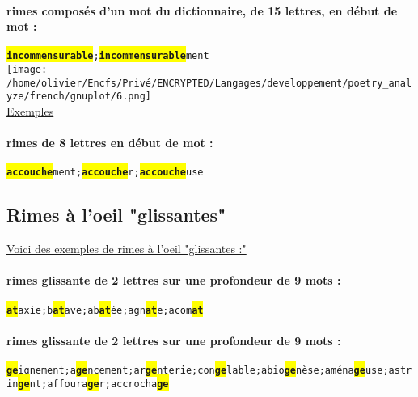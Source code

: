\documentclass[french]{article}
\begin{document}
\paragraph{rimes composés d'un mot du dictionnaire, de 15 lettres, en début de mot :\\}
\texttt{\colorbox{yellow}{\textbf{incommensurable}};\colorbox{yellow}{\textbf{incommensurable}}ment}\\
\newpage
\texttt{[image: /home/olivier/Encfs/Privé/ENCRYPTED/Langages/developpement/poetry\_analyze/french/gnuplot/6.png]}\\
\underline{Exemples}\\
\paragraph{rimes de 8 lettres en début de mot :\\}
\texttt{\colorbox{yellow}{\textbf{accouche}}ment;\colorbox{yellow}{\textbf{accouche}}r;\colorbox{yellow}{\textbf{accouche}}use}\\
\newpage
\subsection{Rimes à l'oeil "glissantes"}
\underline{Voici des exemples de rimes à l'oeil  "glissantes :"}
\paragraph{rimes glissante de 2 lettres sur une profondeur de 9 mots :\\}
\texttt{\colorbox{yellow}{\textbf{at}}axie;b\colorbox{yellow}{\textbf{at}}ave;ab\colorbox{yellow}{\textbf{at}}ée;agn\colorbox{yellow}{\textbf{at}}e;acom\colorbox{yellow}{\textbf{at}}}
\paragraph{rimes glissante de 2 lettres sur une profondeur de 9 mots :\\}
\texttt{\colorbox{yellow}{\textbf{ge}}ignement;a\colorbox{yellow}{\textbf{ge}}ncement;ar\colorbox{yellow}{\textbf{ge}}nterie;con\colorbox{yellow}{\textbf{ge}}lable;abio\colorbox{yellow}{\textbf{ge}}nèse;aména\colorbox{yellow}{\textbf{ge}}use;astrin\colorbox{yellow}{\textbf{ge}}nt;affoura\colorbox{yellow}{\textbf{ge}}r;accrocha\colorbox{yellow}{\textbf{ge}}}
\end{document}

